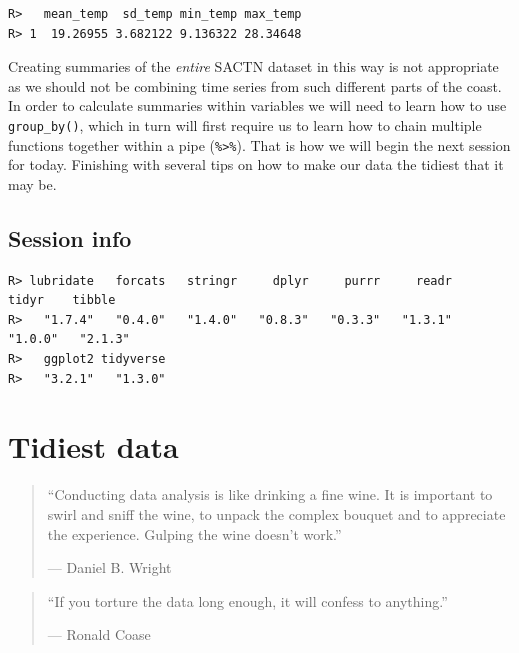 \documentclass[
]{book}
\newenvironment{Shaded}{\begin{snugshade}}{\end{snugshade}}
\newcommand{\KeywordTok}[1]{\textcolor[rgb]{0.13,0.29,0.53}{\textbf{#1}}}
\newcommand{\NormalTok}[1]{#1}
\newcommand{\OperatorTok}[1]{\textcolor[rgb]{0.81,0.36,0.00}{\textbf{#1}}}
\newcommand{\StringTok}[1]{\textcolor[rgb]{0.31,0.60,0.02}{#1}}
\begin{document}
\begin{verbatim}
R>   mean_temp  sd_temp min_temp max_temp
R> 1  19.26955 3.682122 9.136322 28.34648
\end{verbatim}

Creating summaries of the \emph{entire} SACTN dataset in this way is not appropriate as we should not be combining time series from such different parts of the coast. In order to calculate summaries within variables we will need to learn how to use \texttt{group\_by()}, which in turn will first require us to learn how to chain multiple functions together within a pipe (\texttt{\%\textgreater{}\%}). That is how we will begin the next session for today. Finishing with several tips on how to make our data the tidiest that it may be.

\hypertarget{session-info-10}{%
\section{Session info}\label{session-info-10}}

\begin{Shaded}
\end{Shaded}

\begin{verbatim}
R> lubridate   forcats   stringr     dplyr     purrr     readr     tidyr    tibble 
R>   "1.7.4"   "0.4.0"   "1.4.0"   "0.8.3"   "0.3.3"   "1.3.1"   "1.0.0"   "2.1.3" 
R>   ggplot2 tidyverse 
R>   "3.2.1"   "1.3.0"
\end{verbatim}

\hypertarget{tidiest}{%
\chapter{Tidiest data}\label{tidiest}}

\begin{quote}
``Conducting data analysis is like drinking a fine wine. It is important to swirl and sniff the wine, to unpack the complex bouquet and to appreciate the experience. Gulping the wine doesn't work.''

--- Daniel B. Wright
\end{quote}

\begin{quote}
``If you torture the data long enough, it will confess to anything.''

--- Ronald Coase
\end{quote}
\end{document}
